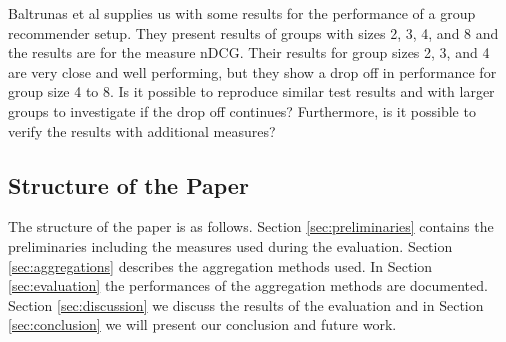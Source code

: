Baltrunas et al supplies us with some results for the performance of a group recommender setup. They present results of groups with sizes 2, 3, 4, and 8 and the results are for the measure nDCG. Their results for group sizes 2, 3, and 4 are very close and well performing, but they show a drop off in performance for group size 4 to 8. Is it possible to reproduce similar test results and with larger groups to investigate if the drop off continues? Furthermore, is it possible to verify the results with additional measures?


\subsection{Structure of the Paper}
The structure of the paper is as follows. Section \ref{sec:preliminaries} contains the preliminaries including the measures used during the evaluation. Section \ref{sec:aggregations} describes the aggregation methods used. In Section \ref{sec:evaluation} the performances of the aggregation methods are documented. Section \ref{sec:discussion} we discuss the results of the evaluation and in Section \ref{sec:conclusion} we will present our conclusion and future work.